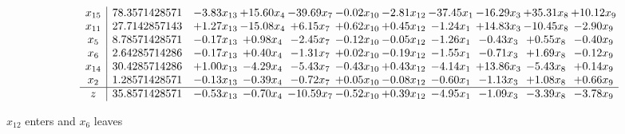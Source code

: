 \documentclass[9pt]{article}
\begin{document}
 \[\begin{array}{c| c c@{\hskip 2pt} c@{\hskip 2pt} c@{\hskip 2pt} c@{\hskip 2pt} c@{\hskip 2pt} c@{\hskip 2pt} c@{\hskip 2pt} c@{\hskip 2pt} c@{\hskip 2pt} }
 x_{15}   &  78.3571428571 & -3.83 x_{13} & + 15.60 x_{4} & -39.69 x_{7} & -0.02 x_{10} & -2.81 x_{12} & -37.45 x_{1} & -16.29 x_{3} & + 35.31 x_{8} & + 10.12 x_{9}\\
 x_{11}   &  27.7142857143 & +  1.27 x_{13} & -15.08 x_{4} & +  6.15 x_{7} & +  0.62 x_{10} & +  0.45 x_{12} & -1.24 x_{1} & + 14.83 x_{3} & -10.45 x_{8} & -2.90 x_{9}\\
 x_{5}   &  8.78571428571 & -0.17 x_{13} & +  0.98 x_{4} & -2.45 x_{7} & -0.12 x_{10} & -0.05 x_{12} & -1.26 x_{1} & -0.43 x_{3} & +  0.55 x_{8} & -0.40 x_{9}\\
 x_{6}   &  2.64285714286 & -0.17 x_{13} & +  0.40 x_{4} & -1.31 x_{7} & +  0.02 x_{10} & -0.19 x_{12} & -1.55 x_{1} & -0.71 x_{3} & +  1.69 x_{8} & -0.12 x_{9}\\
 x_{14}   &  30.4285714286 & +  1.00 x_{13} & -4.29 x_{4} & -5.43 x_{7} & -0.43 x_{10} & +  0.43 x_{12} & -4.14 x_{1} & + 13.86 x_{3} & -5.43 x_{8} & +  0.14 x_{9}\\
 x_{2}   &  1.28571428571 & -0.13 x_{13} & -0.39 x_{4} & -0.72 x_{7} & +  0.05 x_{10} & -0.08 x_{12} & -0.60 x_{1} & -1.13 x_{3} & +  1.08 x_{8} & +  0.66 x_{9}\\
\hline
z    &  35.8571428571 & -0.53 x_{13} & -0.70 x_{4} & -10.59 x_{7} & -0.52 x_{10} & +  0.39 x_{12} & -4.95 x_{1} & -1.09 x_{3} & -3.39 x_{8} & -3.78 x_{9}\\
\end{array}\]


 $ x_{12} $ enters and $ x_{6} $ leaves 
\end{document}
